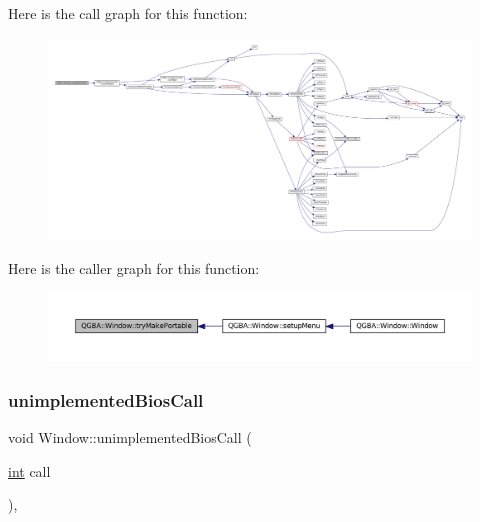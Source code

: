 Here is the call graph for this function\+:
\nopagebreak
\begin{figure}[H]
\begin{center}
\leavevmode
\includegraphics[width=350pt]{class_q_g_b_a_1_1_window_aca690184ec03e5491f7910a37001cf26_cgraph}
\end{center}
\end{figure}
Here is the caller graph for this function\+:
\nopagebreak
\begin{figure}[H]
\begin{center}
\leavevmode
\includegraphics[width=350pt]{class_q_g_b_a_1_1_window_aca690184ec03e5491f7910a37001cf26_icgraph}
\end{center}
\end{figure}
\mbox{\label{class_q_g_b_a_1_1_window_a9364322857735a4bca2b01f69955b123}} 
\subsubsection{\texorpdfstring{unimplemented\+Bios\+Call}{unimplementedBiosCall}}
{\footnotesize\ttfamily void Window\+::unimplemented\+Bios\+Call (\begin{DoxyParamCaption}\item[{\mbox{\hyperlink{ioapi_8h_a787fa3cf048117ba7123753c1e74fcd6}{int}}}]{call }\end{DoxyParamCaption})\hspace{0.3cm}{\ttfamily [private]}, {\ttfamily [slot]}}

